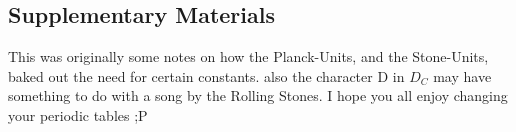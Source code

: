 \begin{multicols}{2}


%

\setcounter{table}{0}
\renewcommand{\thetable}{S\arabic{table}}%
\setcounter{figure}{0}
\renewcommand{\thefigure}{S\arabic{figure}}%
\subsection*{Supplementary Materials}
This was originally some notes on how the Planck-Units, and the Stone-Units\citep{Stoney1883}, baked out the need for certain constants. also the character D in $D_C$ may have something to do with a song by the Rolling Stones. %
I hope you all enjoy changing your periodic tables ;P
\end{multicols}


